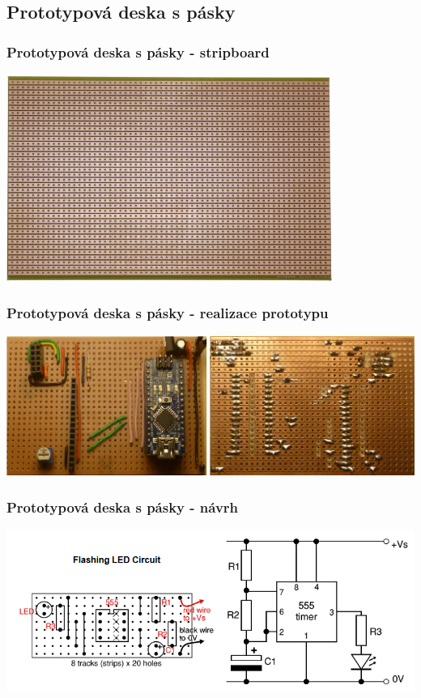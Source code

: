 \documentclass{beamer}
\begin{document}
\subsection{\texorpdfstring{Prototypová deska s pásky}{Prototypova deska s pasky}}
  \begin{frame}
    \frametitle{Prototypová deska s pásky - stripboard}
    \begin{center}
      \includegraphics[width=0.8\textwidth]{obr/stripBoard_bot.png}
    \end{center}
  \end{frame}
  \begin{frame}
    \frametitle{Prototypová deska s pásky - realizace prototypu}
    \begin{center}
      \includegraphics[width=\textwidth]{obr/stripBoard_prot.png}
    \end{center}
  \end{frame}
  \begin{frame}
    \frametitle{Prototypová deska s pásky - návrh}
    \begin{center}
      \includegraphics[width=\textwidth]{obr/stripBoard_desgn.png}
    \end{center}
  \end{frame}
\end{document}

